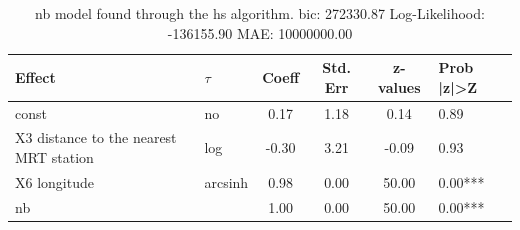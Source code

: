 \begin{table}
	\caption{nb model found through the hs algorithm. bic: 272330.87 Log-Likelihood: -136155.90 MAE: 10000000.00}
	\begin{center}
		\begin{tabular}{|l|l|c|c|c|l|}
			\hline
			Effect & $\tau$ & Coeff & Std. Err & z-values & Prob |z|>Z \\
			\hline
			const & no & 0.17 & 1.18 & 0.14 & 0.89 \\
			\hline
			X3 distance to the nearest MRT station & log & -0.30 & 3.21 & -0.09 & 0.93 \\
			\hline
			X6 longitude & arcsinh & 0.98 & 0.00 & 50.00 & 0.00*** \\
			\hline
			nb &  & 1.00 & 0.00 & 50.00 & 0.00*** \\
			\hline
		\end{tabular}
	\end{center}
\end{table}